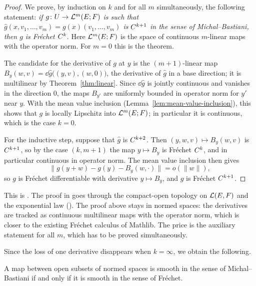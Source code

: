 \begin{proof}
  \leanok
  We prove, by induction on $k$ and for all $m$ simultaneously, the following statement:
  \emph{if $g \colon U \to \mathcal{L}^m(E; F)$ is such that
  $\hat g(x, v_1, \dots, v_m) = g(x)(v_1, \dots, v_m)$ is $C^{k+1}$ in the sense of
  Michal--Bastiani, then $g$ is Fréchet $C^{k}$}. Here $\mathcal{L}^m(E; F)$ is the space of continuous
  $m$-linear maps with the operator norm. For $m = 0$ this is the theorem.

  The candidate for the derivative of $g$ at $y$ is the $(m+1)$-linear map
  $B_y(w, v) = \dd \hat g\bigl((y, v), (w, 0)\bigr)$, the derivative of $\hat g$ in a base
  direction; it is multilinear by Theorem~\ref{thm:linear}. Since $\dd \hat g$ is jointly
  continuous and vanishes in the direction $0$, the maps $B_{y'}$ are uniformly bounded in
  operator norm for $y'$ near $y$. With the mean value inclusion
  (Lemma~\ref{lem:mean-value-inclusion}), this shows that $g$ is locally Lipschitz into
  $\mathcal{L}^m(E; F)$; in particular it is continuous, which is the case $k = 0$.

  For the inductive step, suppose that $\hat g$ is $C^{k+2}$. Then
  $(y, w, v) \mapsto B_y(w, v)$ is $C^{k+1}$, so by the case $(k, m + 1)$ the
  map $y \mapsto B_y$ is Fréchet $C^{k}$, and in particular continuous in operator norm. The mean
  value inclusion then gives
  \[
    \|g(y + w) - g(y) - B_y(w, \cdot)\| = o(\|w\|),
  \]
  so $g$ is Fréchet differentiable with derivative $y \mapsto B_y$, and $g$ is Fréchet
  $C^{k+1}$.
\end{proof}

\begin{remark}
  This is \cite[2.3.17(b)]{GN26}. The proof in \cite{GN26} goes through the compact-open topology on
  $\mathcal{L}(E, F)$ and the exponential law (\cite[1.7.30]{GN26}). The proof above stays in normed spaces:
  the derivatives are tracked as continuous multilinear maps with the operator norm, which is
  closer to the existing Fréchet calculus of Mathlib. The price is the auxiliary statement for
  all $m$, which has to be proved simultaneously.
\end{remark}

Since the loss of one derivative disappears when $k = \infty$, we obtain the following.

\begin{corollary}
  \label{cor:smooth-iff}
  \leanok
  A map between open subsets of normed spaces is smooth in the sense of Michal--Bastiani if and
  only if it is smooth in the sense of Fréchet.
\end{corollary}

